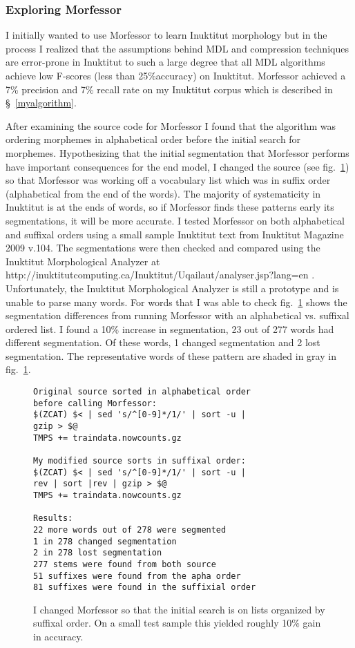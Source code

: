 \documentclass[runningheads,a4paper]{llncs}
\begin{document}
\subsubsection{Exploring Morfessor}

I initially wanted to use Morfessor to learn Inuktitut morphology but in the process I realized that the assumptions behind MDL and compression techniques are error-prone in Inuktitut to such a large degree that all MDL algorithms achieve low F-scores (less than 25\%accuracy) on Inuktitut. Morfessor achieved a 7\% precision and 7\% recall rate on my Inuktitut corpus which is described in \S~\ref{myalgorithm}.

After examining the source code for Morfessor I found that the algorithm was ordering morphemes in alphabetical order before the initial search for morphemes. Hypothesizing that the initial segmentation that Morfessor performs have important consequences for the end model, I changed the source (see fig.~\ref{fig:changemorfessorsource}) so that Morfessor was working off a vocabulary list which was in suffix order (alphabetical from the end of the words). The majority of systematicity in Inuktitut is at the ends of words, so if Morfessor finds these patterns early its segmentations, it will be more accurate. I tested Morfessor on both alphabetical and suffixal orders using a small sample Inuktitut text from Inuktitut Magazine 2009 v.104. The segmentations were then checked and compared using the Inuktitut Morphological Analyzer at http://inuktitutcomputing.ca/Inuktitut/Uqailaut/analyser.jsp?lang=en . Unfortunately, the Inuktitut Morphological Analyzer is still a prototype and is unable to parse many words. For words that I was able to check fig.~\ref{fig:changemorfessorsource} shows the segmentation differences from running Morfessor with an alphabetical vs. suffixal ordered list. I found a 10\% increase in segmentation, 23 out of 277 words had different segmentation. Of these words, 1 changed segmentation and 2 lost segmentation. The representative words of these pattern are shaded in gray in fig.~\ref{fig:changemorfessorsource}.


\begin{figure}[htb]	
	\begin{verbatim}
Original source sorted in alphabetical order 
before calling Morfessor:
$(ZCAT) $< | sed 's/^[0-9]*/1/' | sort -u | 
gzip > $@
TMPS += traindata.nowcounts.gz

My modified source sorts in suffixal order:
$(ZCAT) $< | sed 's/^[0-9]*/1/' | sort -u | 
rev | sort |rev | gzip > $@
TMPS += traindata.nowcounts.gz

Results:
22 more words out of 278 were segmented 
1 in 278 changed segmentation
2 in 278 lost segmentation
277 stems were found from both source	
51 suffixes were found from the apha order
81 suffixes were found in the suffixial order	
\end{verbatim}
	\caption{I changed Morfessor so that the initial search is on lists organized by suffixal order. On a small test sample this yielded roughly 10\% gain in accuracy.}
	\label{fig:changemorfessorsource}
\end{figure}
\end{document}
